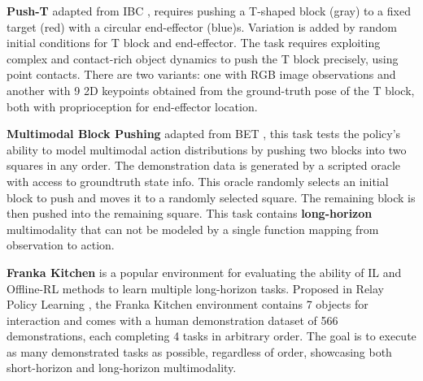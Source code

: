 \documentclass[Afour,sageh,times]{sagej}
\begin{document}
\textbf{Push-T}
\label{sec:eval_sim_pusht}
adapted from IBC \cite{ibc}, requires pushing a T-shaped block (gray) to a fixed target (red) with a circular end-effector (blue)s. Variation is added by random initial conditions for T block and end-effector. The task requires exploiting complex and contact-rich object dynamics to push the T block precisely, using point contacts. There are two variants: one with RGB image observations and another with 9 2D keypoints obtained from the ground-truth pose of the T block, both with proprioception for end-effector location.

\textbf{Multimodal Block Pushing} adapted from BET \cite{bet}, this task tests the policy's ability to model multimodal action distributions by pushing two blocks into two squares in any order. The demonstration data is generated by a scripted oracle with access to groundtruth state info. This oracle randomly selects an initial block to push and moves it to a randomly selected square. The remaining block is then pushed into the remaining square. This task contains \textbf{long-horizon} multimodality that can not be modeled by a single function mapping from observation to action.

\textbf{Franka Kitchen} is a popular environment for evaluating the ability of IL and Offline-RL methods to learn multiple long-horizon tasks. Proposed in Relay Policy Learning \cite{gupta2019relay}, the Franka Kitchen environment contains 7 objects for interaction and comes with a human demonstration dataset of 566 demonstrations, each completing 4 tasks in arbitrary order. The goal is to execute as many demonstrated tasks as possible, regardless of order, showcasing both short-horizon and long-horizon multimodality.
\end{document}
